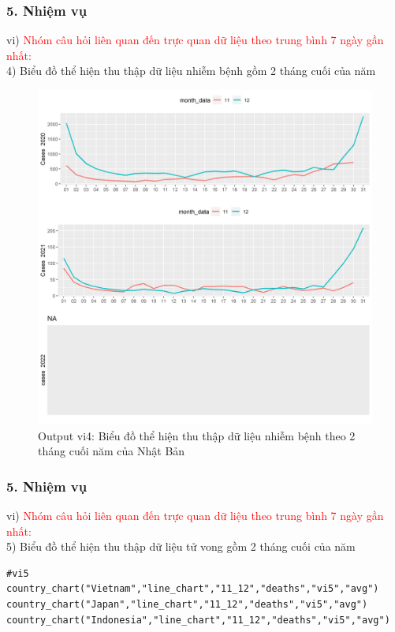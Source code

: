 \documentclass[english,10pt,table]{beamer}
\begin{document}
\begin{frame}[fragile]
\frametitle{5.  Nhiệm vụ}
vi) \textcolor{red}{Nhóm câu hỏi liên quan đến trực quan dữ liệu theo trung bình 7 ngày gần nhất:}\\
    4) Biểu đồ thể hiện thu thập dữ liệu nhiễm bệnh gồm 2 tháng cuối của năm
	\begin{figure}[h!]
	\begin{center}
		    \includegraphics[scale = 0.26]{Images/VI/vi4 Japan .jpeg}
		     \caption{Output vi4: Biểu đồ thể hiện thu thập dữ liệu nhiễm bệnh theo 2 tháng cuối năm của Nhật Bản}
		\end{center}
		\end{figure}
\end{frame}

\begin{frame}[fragile]
\frametitle{5.  Nhiệm vụ}
vi) \textcolor{red}{Nhóm câu hỏi liên quan đến trực quan dữ liệu theo trung bình 7 ngày gần nhất:}\\
    5) Biểu đồ thể hiện thu thập dữ liệu tử vong gồm 2 tháng cuối của năm
    \begin{lstlisting}[frame=single,basicstyle=\tiny]  
#vi5
country_chart("Vietnam","line_chart","11_12","deaths","vi5","avg")
country_chart("Japan","line_chart","11_12","deaths","vi5","avg")
country_chart("Indonesia","line_chart","11_12","deaths","vi5","avg")
		\end{lstlisting}
\end{frame}
\end{document}
